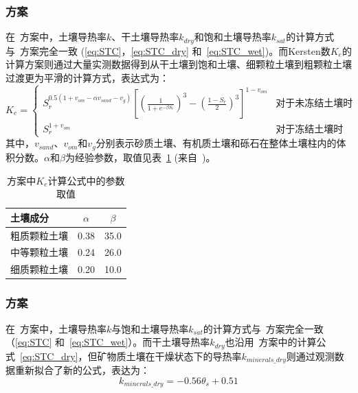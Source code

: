 \subsubsection{\citet{balland2005}方案}
在~\citet{balland2005}方案中，土壤导热率$k$、干土壤导热率$k_{dry}$和饱和土壤导热率$k_{sat}$的计算方式与~\citet{Johansen1975}方案完全一致 (\eqref{eq:STC}，\eqref{eq:STC_dry} 和~\eqref{eq:STC_wet})。而Kersten数$K_e$的计算方案则通过大量实测数据得到从干土壤到饱和土壤、细颗粒土壤到粗颗粒土壤过渡更为平滑的计算方式，表达式为：
\begin{equation}
K_e=\begin{cases}
S_r^{0.5(1+v_{om}-\alpha v_{sand}-v_g)}\left[\left(\frac{1}{1+e^{-\beta S_r}}\right)^3-\left(\frac{1-S_r}{2}\right)^3\right]^{1-v_{om}} & \text {对于未冻结土壤时} \\ 
S_r^{1+v_{om}} & \text {对于冻结土壤时}
\end{cases}
\end{equation}
其中，$v_{sand}$、$v_{om}$和$v_g$分别表示砂质土壤、有机质土壤和砾石在整体土壤柱内的体积分数。$\alpha$和$\beta$为经验参数，取值见表~\ref{tab:Balland-Arp方案中Ke计算参数取值} (来自~\citet{Barry2015thermal})。
{
\begin{table}[htbp]
    \centering
    \caption{\citet{balland2005}方案中$K_e$计算公式中的参数取值}
    \label{tab:Balland-Arp方案中Ke计算参数取值}
    \begin{tabular}{@{}lcc@{}}
    \toprule
    土壤成分               & $\alpha$     & $\beta$  \\
    \midrule
    粗质颗粒土壤                  & 0.38      & 35.0  \\
    中等颗粒土壤                  & 0.24    & 26.0   \\
    细质颗粒土壤         & 0.20   & 10.0    \\
    \bottomrule
    \end{tabular}
\end{table}
}


\subsubsection{\citet{lu2007improved}方案}
在~\citet{lu2007improved}方案中，土壤导热率$k$与饱和土壤导热率$k_{sat}$的计算方式与~\citet{Johansen1975}方案完全一致（\eqref{eq:STC} 和~\eqref{eq:STC_wet}）。而干土壤导热率$k_{dry}$也沿用~\citet{Johansen1975}方案中的计算公式~\eqref{eq:STC_dry}，但矿物质土壤在干燥状态下的导热率$k_{minerals\_dry}$则通过观测数据重新拟合了新的公式，表达为：
\begin{equation}\label{eq:STC_dry_Lu}
k_{minerals\_dry}=-0.56\theta_s+0.51
\end{equation}


